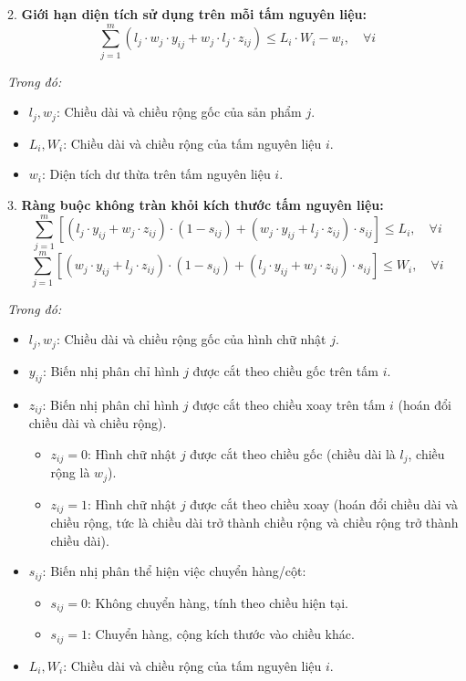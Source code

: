 \documentclass[a4paper]{article}
\begin{document}
2. \textbf{Giới hạn diện tích sử dụng trên mỗi tấm nguyên liệu:}
\begin{equation}
\sum_{j=1}^{m} \left( l_j \cdot w_j \cdot y_{ij} + w_j \cdot l_j \cdot z_{ij} \right) \leq L_i \cdot W_i - w_i, \quad \forall i
\end{equation}

\textit{Trong đó: }
\begin{itemize}
    \item $l_j, w_j$: Chiều dài và chiều rộng gốc của sản phẩm $j$.
    \item $L_i, W_i$: Chiều dài và chiều rộng của tấm nguyên liệu $i$.
    \item $w_i$: Diện tích dư thừa trên tấm nguyên liệu $i$.
\end{itemize}

3. \textbf{Ràng buộc không tràn khỏi kích thước tấm nguyên liệu:}
\begin{equation}
\sum_{j=1}^{m} \left[ \left( l_j \cdot y_{ij} + w_j \cdot z_{ij} \right) \cdot (1 - s_{ij}) + \left( w_j \cdot y_{ij} + l_j \cdot z_{ij} \right) \cdot s_{ij} \right] \leq L_i, \quad \forall i
\end{equation}
\begin{equation}
\sum_{j=1}^{m} \left[ \left( w_j \cdot y_{ij} + l_j \cdot z_{ij} \right) \cdot (1 - s_{ij}) + \left( l_j \cdot y_{ij} + w_j \cdot z_{ij} \right) \cdot s_{ij} \right] \leq W_i, \quad \forall i
\end{equation}

\textit{Trong đó:}
\begin{itemize}
    \item \( l_j, w_j \): Chiều dài và chiều rộng gốc của hình chữ nhật \( j \).
    \item \( y_{ij} \): Biến nhị phân chỉ hình \( j \) được cắt theo chiều gốc trên tấm \( i \).
    \item \( z_{ij} \): Biến nhị phân chỉ hình \( j \) được cắt theo chiều xoay trên tấm \( i \) (hoán đổi chiều dài và chiều rộng).
        \begin{itemize}
        \item \( z_{ij} = 0 \): Hình chữ nhật \( j \) được cắt theo chiều gốc (chiều dài là \( l_j \), chiều rộng là \( w_j \)).
        \item \( z_{ij} = 1 \): Hình chữ nhật \( j \) được cắt theo chiều xoay (hoán đổi chiều dài và chiều rộng, tức là chiều dài trở thành chiều rộng và chiều rộng trở thành chiều dài).
    \end{itemize}
    \item \( s_{ij} \): Biến nhị phân thể hiện việc chuyển hàng/cột:
    \begin{itemize}
        \item \( s_{ij} = 0 \): Không chuyển hàng, tính theo chiều hiện tại.
        \item \( s_{ij} = 1 \): Chuyển hàng, cộng kích thước vào chiều khác.
    \end{itemize}
    \item \( L_i, W_i \): Chiều dài và chiều rộng của tấm nguyên liệu \( i \).
\end{itemize}
\end{document}
